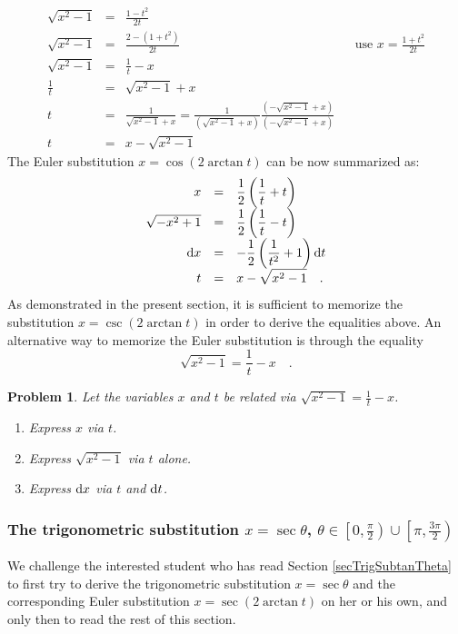 \documentclass[12pt]{book}
\newtheorem{problem}[theorem]{Problem}
\begin{document}
\[
\begin{array}{rcll|l}
\displaystyle \sqrt{x^2-1 }&=&\displaystyle \frac{1-t^2}{2t}\\
\displaystyle \sqrt{x^2-1 }&=&\displaystyle \frac{2-(1+t^2)}{2t} &&\displaystyle \text{use } x=\frac{1+t^2}{2t}\\
\displaystyle \sqrt{x^2-1}&=&\displaystyle \frac{1}{t}-x\\
\displaystyle \frac{1}{t}&=&\displaystyle \sqrt{x^2-1}+x\\
t&=& \displaystyle \frac{1}{\sqrt{x^2-1}+x}= \frac{1}{(\sqrt{x^2-1}+x)} \frac{ (-\sqrt{x^2-1}+x)} {(-\sqrt{x^2-1}+x)}\\
t&=&\displaystyle x-\sqrt{x^2-1}
\end{array}
\]
The Euler substitution $x= \cos (2\arctan t)$ can be now summarized as:
\[
\begin{array}{rcl}
x&=&\displaystyle \frac{1}{2}\left(\frac{1}{t}+t\right)\\
\sqrt{-x^2+1}&=&\displaystyle\frac12 \left(\frac{1}{t} - t \right) \\
{\normalfont \text{d}} x&=&\displaystyle  -\frac{1}{2}\left(\frac{1}{t^2}+1\right) {\normalfont \text{d}} t\\
t&=&\displaystyle x-\sqrt{x^2-1}\quad .
\end{array}
\]
As demonstrated in the present section, it is sufficient to memorize the substitution $x=\csc (2\arctan t)$ in order to derive the equalities above. An alternative way to memorize the Euler substitution is through the equality
\[
\sqrt{x^2-1}=\frac{1}{t}-x\quad .
\]
\begin{problem}
Let the variables $x$ and $t$ be related via $\sqrt{x^2-1}=\frac{1}{t}-x$.
\begin{enumerate}
\item Express $x$ via $t$.
\item Express $\sqrt{x^2-1}$ via $t$ alone.
\item Express ${\normalfont \text{d}} x$ via $t$ and ${\normalfont \text{d}} t$.
\end{enumerate}
\end{problem}
\subsubsection{The trigonometric substitution $x=\sec \theta$, $\theta \in \left[0, \frac{\pi}{2}\right)\cup \left[\pi, \frac{3\pi}{2}\right) $}
We challenge the interested student who has read Section \ref{secTrigSubtanTheta} to first try to derive the trigonometric substitution $x=\sec \theta$ and the corresponding Euler substitution $x=\sec (2\arctan t)$  on her or his own, and only then to read the rest of this section.
\end{document}
